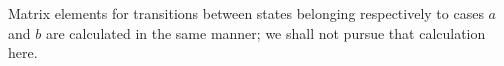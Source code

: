 Matrix elements for transitions between states belonging respectively to cases $a$ and $b$ are calculated in the same manner; we shall not pursue that calculation here.
